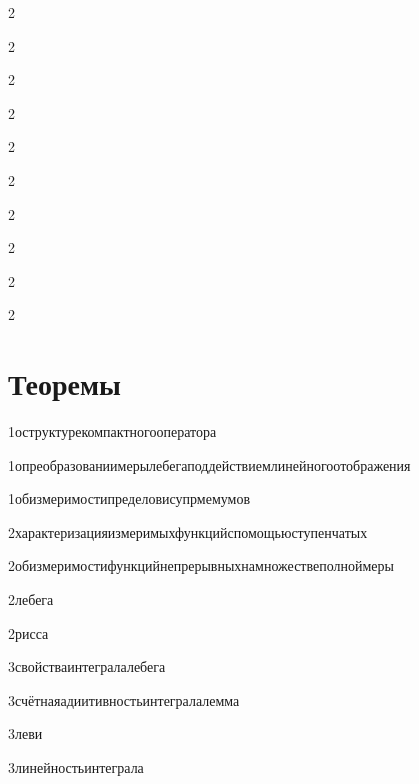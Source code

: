 {2}{}

{2}{}

{2}{}

{2}{}

{2}{}

{2}{}

{2}{}

{2}{}

{2}{}

{2}{}


\section{Теоремы}

{1}{оструктурекомпактногооператора}

{1}{опреобразованиимерылебегаподдействиемлинейногоотображения}

{1}{обизмеримостипределовисупрмемумов}

{2}{характеризацияизмеримыхфункцийспомощьюступенчатых}

{2}{обизмеримостифункцийнепрерывныхнамножествеполноймеры}

{2}{лебега}

{2}{рисса}

{3}{свойстваинтегралалебега}

{3}{счётнаяадиитивностьинтегралалемма}

{3}{леви}

{3}{линейностьинтеграла}

